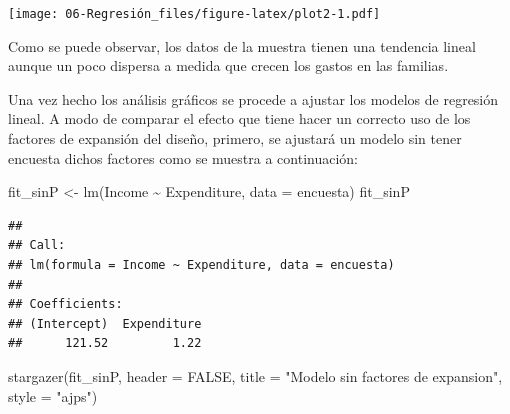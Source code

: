 \documentclass[
  12pt,
]{book}
\newenvironment{Shaded}{\begin{snugshade}}{\end{snugshade}}
\newcommand{\AttributeTok}[1]{\textcolor[rgb]{0.77,0.63,0.00}{#1}}
\newcommand{\ConstantTok}[1]{\textcolor[rgb]{0.00,0.00,0.00}{#1}}
\newcommand{\FunctionTok}[1]{\textcolor[rgb]{0.00,0.00,0.00}{#1}}
\newcommand{\NormalTok}[1]{#1}
\newcommand{\OtherTok}[1]{\textcolor[rgb]{0.56,0.35,0.01}{#1}}
\newcommand{\SpecialCharTok}[1]{\textcolor[rgb]{0.00,0.00,0.00}{#1}}
\newcommand{\StringTok}[1]{\textcolor[rgb]{0.31,0.60,0.02}{#1}}
\begin{document}
\texttt{[image: 06-Regresión\_files/figure-latex/plot2-1.pdf]}

Como se puede observar, los datos de la muestra tienen una tendencia lineal aunque un poco dispersa a medida que crecen los gastos en las familias.

Una vez hecho los análisis gráficos se procede a ajustar los modelos de regresión lineal. A modo de comparar el efecto que tiene hacer un correcto uso de los factores de expansión del diseño, primero, se ajustará un modelo sin tener encuesta dichos factores como se muestra a continuación:

\begin{Shaded}
\begin{Highlighting}[]
\NormalTok{fit\_sinP }\OtherTok{\textless{}{-}} \FunctionTok{lm}\NormalTok{(Income }\SpecialCharTok{\textasciitilde{}}\NormalTok{ Expenditure, }\AttributeTok{data =}\NormalTok{ encuesta)}
\NormalTok{fit\_sinP}
\end{Highlighting}
\end{Shaded}

\begin{verbatim}
## 
## Call:
## lm(formula = Income ~ Expenditure, data = encuesta)
## 
## Coefficients:
## (Intercept)  Expenditure  
##      121.52         1.22
\end{verbatim}

\begin{Shaded}
\begin{Highlighting}[]
\FunctionTok{stargazer}\NormalTok{(fit\_sinP, }\AttributeTok{header =} \ConstantTok{FALSE}\NormalTok{,}
          \AttributeTok{title =} \StringTok{"Modelo sin factores de expansion"}\NormalTok{, }
          \AttributeTok{style =} \StringTok{"ajps"}\NormalTok{)}
\end{Highlighting}
\end{Shaded}
\end{document}
